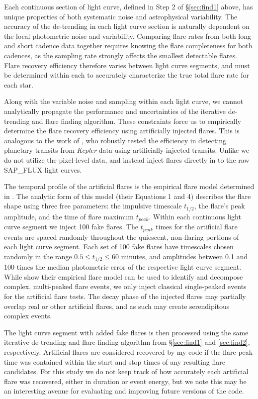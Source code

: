 \documentclass[twocolumn]{aastex6}
\newcommand{\Kepler}{\textsl{Kepler}\xspace}
\begin{document}
Each continuous section of light curve, defined in Step 2 of \S\ref{sec:find1} above, has unique properties of both systematic noise and astrophysical variability. The accuracy of the de-trending in each light curve section is naturally dependent on the local photometric noise and variability. Comparing flare rates from both long and short cadence data together requires knowing the flare completeness for both cadences, as the sampling rate strongly affects the smallest detectable flares.
Flare recovery efficiency therefore varies between light curve segments, and must be determined within each to accurately characterize the true total flare rate for each star.

Along with the variable noise and sampling within each light curve, we cannot analytically propagate the performance and uncertainties of the iterative de-trending and flare finding algorithm. These constraints force us to empirically determine the flare recovery efficiency using artificially injected flares. This is analogous to the work of \citet{christiansen2013}, who robustly tested the efficiency in detecting planetary transits from \Kepler data using artificially injected transits. Unlike \citet{christiansen2013} we do not utilize the pixel-level data, and instead inject flares directly in to the raw SAP\_FLUX light curves.

The temporal profile of the artificial flares is the empirical flare model determined in \citet{davenport2014b}. The analytic form of this model (their Equations 1 and 4) describes the flare shape using three free parameters: the impulsive timescale $t_{1/2}$, the flare's peak amplitude, and the time of flare maximum $t_{peak}$.
Within each continuous light curve segment we inject 100 fake flares. The $t_{peak}$ times for the artificial flare events are spaced randomly throughout the quiescent, non-flaring portions of each light curve segment. Each set of 100 fake flares have timescales chosen randomly in the range $0.5 \le t_{1/2} \le 60$ minutes, and amplitudes between 0.1 and 100 times the median photometric error of the respective light curve segment. While \citet{davenport2014b} show their empirical flare model can be used to identify and decompose complex, multi-peaked flare events, we only inject classical single-peaked events for the artificial flare tests. The decay phase of the injected flares may partially overlap real or other artificial flares, and as such may create serendipitous complex events.

The light curve segment with added fake flares is then processed using the same iterative de-trending and flare-finding algorithm from \S\ref{sec:find1} and \ref{sec:find2}, respectively. Artificial flares are considered recovered by my code if the flare peak time was contained within the start and stop times of any resulting flare candidates. For this study we do not keep track of how accurately each artificial flare was recovered, either in duration or event energy, but we note this may be an interesting avenue for evaluating and improving future versions of the code.
\end{document}
